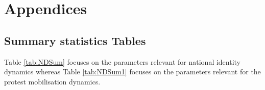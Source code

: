 \appendix
\chapter*{Appendices}%
{}%
\renewcommand{\thesection}{\Alph{section}}%
\setcounter{table}{5}
\setcounter{figure}{5}


\section{Summary statistics Tables}
\label{appendix:1}

Table \ref{tab:NDSum} focuses on the parameters relevant for national identity dynamics whereas Table \ref{tab:NDSum1} focuses on the parameters relevant for the protest mobilisation dynamics.\\ 

